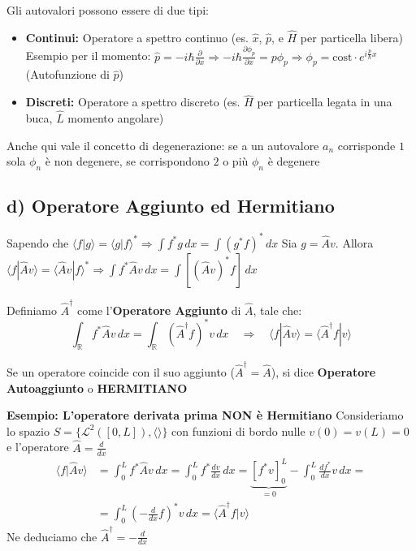 \documentclass[11pt, a4paper]{article}
\begin{document}
Gli autovalori possono essere di due tipi:
\begin{itemize}
    \item \textbf{Continui:} Operatore a spettro continuo (es. $\hat{x}$, $\hat{p}$, e $\hat{H}$ per particella libera) %
    Esempio per il momento: $\hat{p} = -i\hbar \frac{\partial}{\partial x} \Rightarrow -i\hbar \frac{\partial \phi_p}{\partial x} = p \phi_p \Rightarrow \phi_p = \text{cost} \cdot e^{i\frac{p}{\hbar}x}$ (Autofunzione di $\hat{p}$) %
    \item \textbf{Discreti:} Operatore a spettro discreto (es. $\hat{H}$ per particella legata in una buca, $\hat{L}$ momento angolare) %
\end{itemize}

\noindent
Anche qui vale il concetto di degenerazione: se a un autovalore $a_n$ corrisponde $1$ sola $\phi_n$ è non degenere, se corrispondono $2$ o più $\phi_n$ è degenere %

\subsection{d) Operatore Aggiunto ed Hermitiano} %
Sapendo che $\langle f | g \rangle = \langle g | f \rangle^* \Rightarrow \int f^* g \, dx = \int (g^* f)^* \, dx$ %
Sia $g = \hat{A}v$. Allora $\langle f | \hat{A}v \rangle = \langle \hat{A}v | f \rangle^* \Rightarrow \int f^* \hat{A}v \, dx = \int \left[ (\hat{A}v)^* f \right] \, dx$ %

\noindent
Definiamo $\hat{A}^\dagger$ come l'\textbf{Operatore Aggiunto} di $\hat{A}$, tale che: %
\begin{equation}
    \int_{\mathbb{R}} f^* \hat{A}v \, dx = \int_{\mathbb{R}} (\hat{A}^\dagger f)^* v \, dx \quad \Rightarrow \quad \langle f | \hat{A}v \rangle = \langle \hat{A}^\dagger f | v \rangle %
\end{equation}

\noindent
Se un operatore coincide con il suo aggiunto ($\boxed{ \hat{A}^\dagger = \hat{A} }$), si dice \textbf{Operatore Autoaggiunto} o \textbf{HERMITIANO} %

\noindent
\textbf{Esempio: L'operatore derivata prima NON è Hermitiano} %
Consideriamo lo spazio $S = \{ \mathcal{L}^2([0,L]), \langle \rangle \}$ con funzioni di bordo nulle $v(0)=v(L)=0$ e l'operatore $\hat{A} = \frac{d}{dx}$ %
\begin{align*}
    \langle f | \hat{A} v \rangle &= \int_0^L f^* \hat{A} v \, dx = \int_0^L f^* \frac{dv}{dx} \, dx = \underbrace{ \left[ f^* v \right]_0^L }_{=0} - \int_0^L \frac{df^*}{dx} v \, dx = \\ %
    &= \int_0^L \left( -\frac{d}{dx} f \right)^* v \, dx = \langle \hat{A}^\dagger f | v \rangle %
\end{align*}
Ne deduciamo che $\hat{A}^\dagger = -\frac{d}{dx}$ 
\end{document}
